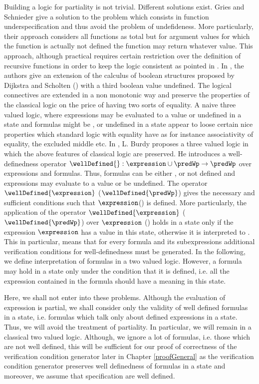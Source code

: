 Building a logic for partiality is not trivial. Different solutions exist. 
Gries and Schnieder \cite{gries95avoiding} give a solution to the problem which consists in function 
underspecification  and thus  avoid the problem of undefideness.
 More particularly, their approach considers all functions as total but for argument values for which the function is actually 
not defined the function may return whatever value. This approach, although practical requires certain restriction over the definition 
of recursive functions in order to keep the logic consistent as pointed in \cite{J95PFL}. In  \cite{schieder99adapting}, the authors give 
  an extension  of the calculus of boolean structures proposed by Dijkstra and Scholten (\cite{WPCDS}) with a  third boolean value 
undefined.  The logical connectives are extended in a non monotonic way and preserve the properties of the classical logic
on the price  of having two sorts of equality.
A naive three valued logic, where expressions may be evaluated to a value or  undefined  in a state and
 formulas might be \false{}, \true{} or undefined in a state appear to loose certain nice properties
 which standard logic with equality have
as for instance associativity of equality, the excluded middle \cite{gries95avoiding} etc. 
In \cite{burdy98treatment}, L. Burdy proposes a three valued logic in which the above features of classical logic are preserved.
He introduces a well-definedness operator $\wellDefined{}: \expression \cup \predWp \rightarrow \predWp$
 over expressions and formulas. Thus, formulas can be either \true{}, \false{} or not defined and
expressions may evaluate to a value or be undefined. The operator  $\wellDefined{\expression}$ ($\wellDefined{\predWp}$) 
 gives the necessary and sufficient
 conditions such that $\expression$(\predWp ) is defined.
 More particularly, the application of the operator   $\wellDefined{\expression}$  ($\wellDefined{\predWp}$) over $\expression$  (\predWp ) 
 holds in a state only if the expression $\expression$ has  a value in this state, otherwise it is interpreted to \false{}.
 This in particular, means that for every formula and its subexpressions additional verification conditions for well-definedness must be generated.
 In the following, we define interpretation of formulas  in a two valued logic. However, a formula may hold in a state only under the condition that
 it is  defined, i.e. all the expression contained in the formula should have a meaning in  this state.
 
 Here, we shall not enter into these problems. Although the evaluation of expression is partial, we shall consider only the validity of well defined 
 formulas in a state, i.e. formulas which talk only about defined expressions in a state.
 Thus, we will avoid the treatment of partiality. In particular, we will remain in 
 a classical two valued logic. 
 Although, we ignore a lot of formulas, i.e. those which are not well defined,
 this will be sufficient for our proof of correctness of the verification condition generator later in Chapter \ref{proofGeneral} as 
 the verification condition generator preserves well definedness of formulas in a state and moreover, we  assume that specification are well defined.

